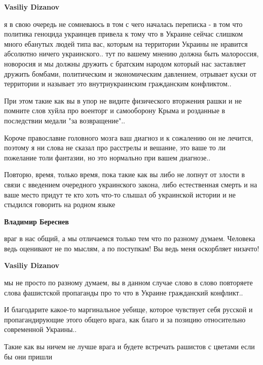 \begin{itemize}
\begin{itemize}
\textbf{Vasiliy Dizanov} 

я в свою очередь не сомневаюсь в том с чего началась переписка - в том что
политика геноцида украинцев привела к тому что в Украине сейчас слишком много
ебанутых людей типа вас, которым на территории Украины не нравится абсолютно
ничего украинского.. тут по вашему мнению должна быть малороссия, новоросия и
мы должны дружить с братским народом который нас заставляет дружить бомбами,
политическим и экономическим давлением, отрывает куски от территории и называет
это внутриукраинским гражданским конфликтом..

При этом такие как вы в упор не видите физического вторжения рашки и не помните
слов хуйла про военторг и самооборону Крыма и розданные в последствии медали
"за возвращение"..

Короче православие головного мозга ваш диагноз и к сожалению он не лечится,
поэтому я ни слова не сказал про расстрелы и вешание, это ваше то ли пожелание
толи фантазии, но это нормально при вашем диагнозе..

Повторю, время, только время, пока такие как вы либо не лопнут от злости в
связи с введением очередного украинского закона, либо естественная смерть и на
ваше место придут те кто хоть что-то слышал об украинской истории и не стыдился
говорить на родном языке


\textbf{Владимир Береснев} 

враг в нас общий, а мы отличаемся только тем что по разному думаем. Человека
ведь оценивают не по мыслям, а по поступкам! Вы ведь меня оскорбляет низачто!



\textbf{Vasiliy Dizanov} 

мы не просто по разному думаем, вы в данном случае
слово в слово повторяете слова фашистской пропаганды про то что в Украине
гражданский конфликт..

И благодарите какое-то маргинальное уебище, которое чувствует себя русской и
пропагандирующие этого общего врага, как благо и за позицию относительно
современной Украины..

Такие как вы ничем не лучше врага и будете встречать рашистов с цветами если бы
они пришли



\end{itemize}
\end{itemize}
